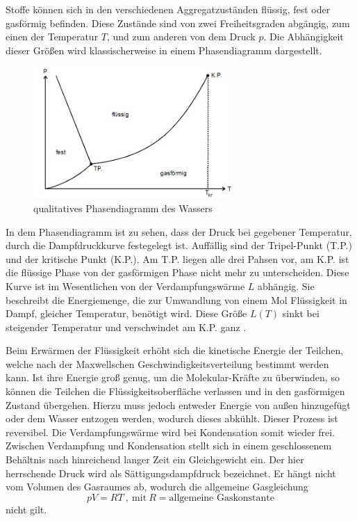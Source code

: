 Stoffe können sich in den verschiedenen Aggregatzuständen flüssig, fest oder gasförmig
befinden. Diese Zustände sind von zwei Freiheitsgraden abgängig, zum einen der Temperatur $T$,
und zum anderen von dem Druck $p$. Die Abhängigkeit dieser Größen wird klassischerweise
in einem Phasendiagramm dargestellt.

\begin{figure}   %
  \centering
  \includegraphics[height=5cm]{Zustandsdiagramm.jpeg}
  \caption{qualitatives Phasendiagramm des Wassers \cite{TU}}
  \label{fig:phase}
\end{figure}

In dem Phasendiagramm ist zu sehen, dass der Druck bei gegebener Temperatur, durch die
Dampfdruckkurve festegelegt ist. Auffällig sind der Tripel-Punkt (T.P.) und
der kritische Punkt (K.P.). Am T.P. liegen alle drei Pahsen vor, am K.P. ist die flüssige
Phase von der gasförmigen Phase nicht mehr zu unterscheiden.
Diese Kurve ist im Wesentlichen von der Verdampfungswärme $L$ abhängig. Sie beschreibt
die Energiemenge, die zur Umwandlung von einem Mol Flüssigkeit in Dampf, gleicher
Temperatur, benötigt wird. Diese Größe $L(T)$ sinkt bei steigender Temperatur und
verschwindet am K.P. ganz \cite{chem}.

Beim Erwärmen der Flüssigkeit erhöht sich die kinetische Energie der Teilchen,
welche nach der Maxwellschen Geschwindigkeitsverteilung bestimmt werden kann. Ist
ihre Energie groß genug, um die Molekular-Kräfte zu überwinden, so können die
Teilchen die Flüssigkeitsoberfläche verlassen und in den gasförmigen Zustand übergehen.
Hierzu muss jedoch entweder Energie von außen hinzugefügt oder dem Wasser entzogen
werden, wodurch dieses abkühlt. Dieser Prozess ist reversibel. Die Verdampfungswärme
wird bei Kondensation somit wieder frei. Zwischen Verdampfung und Kondensation stellt
sich in einem geschlossenem Behältnis nach hinreichend langer Zeit ein Gleichgewicht
ein. Der hier herrschende Druck wird als Sättigungsdampfdruck
bezeichnet. Er hängt nicht vom Volumen des Gasraumes ab, wodurch die allgemeine
Gasgleichung
\begin{equation}
  pV = RT   \ ,\ \text{mit} \ R = \text{allgemeine Gaskonstante} \label{eq:ideal}
\end{equation}
nicht gilt.

